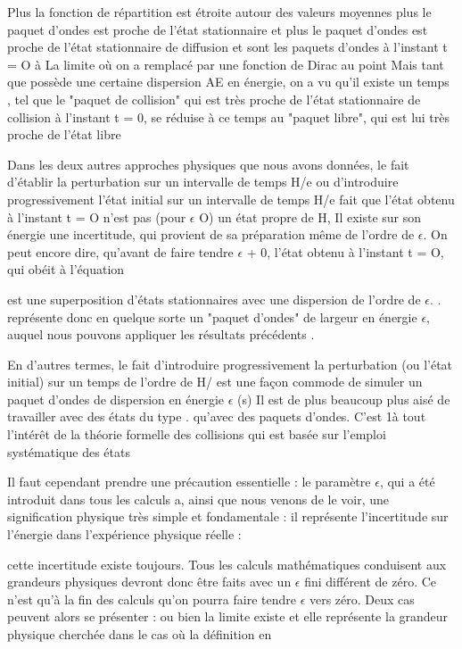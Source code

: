 Plus la fonction de répartition  est étroite autour
des valeurs moyennes  plus le paquet d'ondes  est proche
de l'état stationnaire  et plus le paquet d'ondes  est proche
de l'état stationnaire de diffusion  et  sont les
paquets d'ondes à l'instant t = O à La limite où on a remplacé 
par une fonction de Dirac au point  Mais tant que  possède
une certaine dispersion AE en énergie, on a vu qu'il existe un temps
, tel que le "paquet de collision" qui est très proche de l'état
stationnaire de collision à l'instant t = 0, se réduise à ce temps au "paquet libre",
qui est lui très proche de l'état libre 

Dans les deux autres approches physiques que nous avons données,
le fait d'établir la perturbation sur un intervalle de temps H/e ou d'introduire
progressivement l'état initial sur un intervalle de temps H/e
fait que l'état obtenu à l'instant t = O n'est pas (pour $\epsilon$  O) un état
propre de H, Il existe sur son énergie une incertitude, qui provient de sa
préparation même de l'ordre de $\epsilon$. On peut encore dire, qu'avant de faire
tendre $\epsilon$ + 0, l'état obtenu à l'instant t = O,  qui obéit à l'équation 


est une superposition d'états stationnaires  avec une dispersion
de l'ordre de $\epsilon$. . représente donc en quelque sorte un "paquet
d'ondes" de largeur en énergie $\epsilon$, auquel nous pouvons appliquer les résultats précédents .

En d'autres termes, le fait d'introduire progressivement la
perturbation (ou l'état initial) sur un temps de l'ordre de H/ est une
façon commode de simuler un paquet d'ondes de dispersion en énergie $\epsilon$ (s)
Il est de plus beaucoup plus aisé de travailler avec des états du type
. qu'avec des paquets d'ondes. C'est 1à tout l'intérêt de la
théorie formelle des collisions qui est basée sur l'emploi systématique
des états 

Il faut cependant prendre une précaution essentielle : le
paramètre $\epsilon$, qui a été introduit dans tous les calculs a, ainsi que nous
venons de le voir, une signification physique très simple et fondamentale :
il représente l'incertitude sur l'énergie dans l'expérience physique réelle :

cette incertitude existe toujours. Tous les calculs mathématiques conduisent
aux grandeurs physiques devront donc être faits avec un $\epsilon$ fini différent de
zéro. Ce n'est qu'à la fin des calculs qu'on pourra faire tendre $\epsilon$ vers zéro.
Deux cas peuvent alors se présenter : ou bien la limite existe et elle
représente la grandeur physique cherchée dans le cas où la définition en


